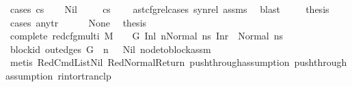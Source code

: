 \begin{isabellebody}
\ {\isacharparenleft}{\kern0pt}cases\ cs{}{\isacharparenright}{\kern0pt}\isanewline
\ \ \isamarkupfalse%
\ Nil\ \isanewline
\ \ \isamarkupfalse%
\ {\isachardoublequoteopen}cs{}\ {\isacharequal}{\kern0pt}\ {\isacharbrackleft}{\kern0pt}{\isacharbrackright}{\kern0pt}{\isachardoublequoteclose}\ \isamarkupfalse%
\ ast{\isacharunderscore}{\kern0pt}cfg{\isacharunderscore}{\kern0pt}rel{\isachardot}{\kern0pt}cases\ syn{\isacharunderscore}{\kern0pt}rel\ assms{\isacharparenleft}{\kern0pt}{}{\isacharparenright}{\kern0pt}\ \isamarkupfalse%
\ blast\ \isanewline
\ \ \isamarkupfalse%
\ {\isacharquery}{\kern0pt}thesis\isanewline
\ \ \isamarkupfalse%
\ {\isacharparenleft}{\kern0pt}cases\ any{\isacharunderscore}{\kern0pt}tr{\isacharparenright}{\kern0pt}\isanewline
\ \ \ \ \isamarkupfalse%
\ None\ \isamarkupfalse%
\ {\isacharquery}{\kern0pt}thesis\isanewline
\ \ \ \ \isamarkupfalse%
\ {\isacharminus}{\kern0pt}\isanewline
\ \ \ \ \ \ \isamarkupfalse%
\ complete{\isacharcolon}{\kern0pt}\ {\isachardoublequoteopen}{\isacharparenleft}{\kern0pt}red{\isacharunderscore}{\kern0pt}cfg{\isacharunderscore}{\kern0pt}multi\ M\ {\isasymLambda}\ {\isasymGamma}\ {\isasymOmega}\ G\ {\isacharparenleft}{\kern0pt}{\isacharparenleft}{\kern0pt}Inl\ n{\isacharparenright}{\kern0pt}{\isacharcomma}{\kern0pt}{\isacharparenleft}{\kern0pt}Normal\ ns{}{\isacharparenright}{\kern0pt}{\isacharparenright}{\kern0pt}\ {\isacharparenleft}{\kern0pt}Inr\ {\isacharparenleft}{\kern0pt}{\isacharparenright}{\kern0pt}{\isacharcomma}{\kern0pt}\ Normal\ ns{}{\isacharparenright}{\kern0pt}{\isacharparenright}{\kern0pt}{\isachardoublequoteclose}\ \isanewline
\ \ \ \ \ \ \ \ \isamarkupfalse%
\ block{\isacharunderscore}{\kern0pt}id\ {\isacartoucheopen}out{\isacharunderscore}{\kern0pt}edges\ G\ {\isacharbang}{\kern0pt}\ n\ {\isacharequal}{\kern0pt}\ {\isacharbrackleft}{\kern0pt}{\isacharbrackright}{\kern0pt}{\isacartoucheclose}\ Nil\ node{\isacharunderscore}{\kern0pt}to{\isacharunderscore}{\kern0pt}block{\isacharunderscore}{\kern0pt}assm\isanewline
\ \ \ \ \ \ \ \ \isamarkupfalse%
\ {\isacharparenleft}{\kern0pt}metis\ RedCmdListNil\ RedNormalReturn\ push{\isacharunderscore}{\kern0pt}through{\isacharunderscore}{\kern0pt}assumption{}\ push{\isacharunderscore}{\kern0pt}through{\isacharunderscore}{\kern0pt}assumption{}\ r{\isacharunderscore}{\kern0pt}into{\isacharunderscore}{\kern0pt}rtranclp{\isacharparenright}{\kern0pt}\isanewline

\end{isabellebody}
